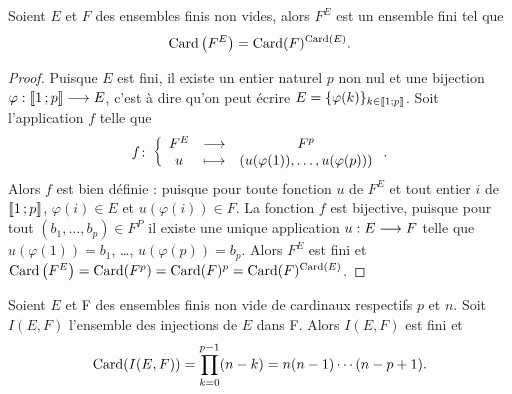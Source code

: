 \begin{theo}
  Soient \(E\) et \(F\) des ensembles finis non vides, alors \(F^E\) est un 
  ensemble fini tel que
  \begin{equation}
    \operatorname{Card}\left(F^E\right) = \operatorname{Card}(F)^{\operatorname{Card}(E)}.
  \end{equation}
\end{theo}

\begin{proof}
  Puisque \(E\) est fini, il existe un entier naturel \(p\) non nul et une 
  bijection \(\varphi:\mathopen{\llbracket}1\mathclose{}\mathpunct{};p\mathclose{\rrbracket} \longrightarrow E\), c'est à dire 
  qu'on peut écrire \(E = \{\varphi(k)\}_{k\in\mathopen{\llbracket}1\mathclose{}\mathpunct{};p\mathclose{\rrbracket}}\). Soit 
  l'application \(f\) telle que
  \begin{equation}
    f\colon \left\{\begin{array}{ccc} F^E & \longrightarrow &F^p\\ u & \longmapsto & (u(\varphi(1)), \ldots, u(\varphi(p))) \end{array} \right..
  \end{equation}
  Alors \(f\) est bien définie : puisque pour toute fonction \(u\) de \(F^E\) et 
  tout entier \(i\) de \(\mathopen{\llbracket}1\mathclose{}\mathpunct{};p\mathclose{\rrbracket}\), \(\varphi(i) \in E\) et 
  \(u(\varphi(i))\in F\). La fonction \(f\) est bijective, puisque pour tout 
  \((b_1, \ldots, b_p) \in F^P\) il existe une unique application 
  \(u:E \longrightarrow F\) telle que \(u(\varphi(1)) = b_1\), \ldots, 
  \(u(\varphi(p)) = b_p\). Alors \(F^E\) est fini et \(\operatorname{Card}\left(F^E\right) = 
  \operatorname{Card}(F^p) = \operatorname{Card}(F)^p = \operatorname{Card}(F)^{\operatorname{Card}(E)}\).
\end{proof}

\begin{prop}
  \label{prop:nbinj}
  Soient \(E\) et F des ensembles finis non vide de cardinaux respectifs \(p\) 
  et \(n\). Soit \(I(E, F)\) l'ensemble des injections de \(E\) dans F. Alors 
  \(I(E, F)\) est fini et
  \begin{equation}
    \operatorname{Card}(I(E, F)) = \prod_{k = 0}^{p - 1}(n - k) = n(n - 1) \dotsm (n - p + 1).
  \end{equation}
\end{prop}

